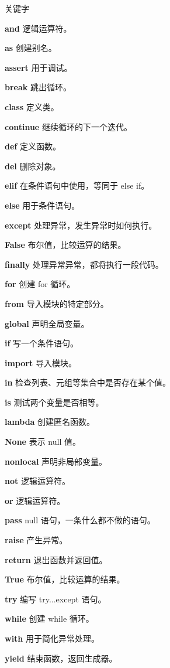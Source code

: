\documentclass[11pt]{beamer}
\begin{document}
\begin{frame}{关键字}
	\scriptsize
	\begin{multicols}{3}
		\textbf{and}	逻辑运算符。

		\textbf{as}	创建别名。

		\textbf{assert}	用于调试。

		\textbf{break}	跳出循环。

		\textbf{class}	定义类。

		\textbf{continue}	继续循环的下一个迭代。

		\textbf{def}	定义函数。

		\textbf{del}	删除对象。

		\textbf{elif}	在条件语句中使用，等同于 else if。

		\textbf{else}	用于条件语句。

		\textbf{except}	处理异常，发生异常时如何执行。

		\textbf{False}	布尔值，比较运算的结果。

		\textbf{finally}	处理异常异常，都将执行一段代码。

		\textbf{for}	创建 for 循环。

		\textbf{from}	导入模块的特定部分。

		\textbf{global}	声明全局变量。

		\textbf{if}	写一个条件语句。

		\textbf{import}	导入模块。

		\textbf{in}	检查列表、元组等集合中是否存在某个值。

		\textbf{is}	测试两个变量是否相等。

		\textbf{lambda}	创建匿名函数。

		\textbf{None}	表示 null 值。

		\textbf{nonlocal}	声明非局部变量。

		\textbf{not}	逻辑运算符。

		\textbf{or}	逻辑运算符。

		\textbf{pass}	null 语句，一条什么都不做的语句。

		\textbf{raise}	产生异常。

		\textbf{return}	退出函数并返回值。

		\textbf{True}	布尔值，比较运算的结果。

		\textbf{try}	编写 try...except 语句。

		\textbf{while}	创建 while 循环。

		\textbf{with}	用于简化异常处理。

		\textbf{yield}	结束函数，返回生成器。
	\end{multicols}
\end{frame}
\end{document}

